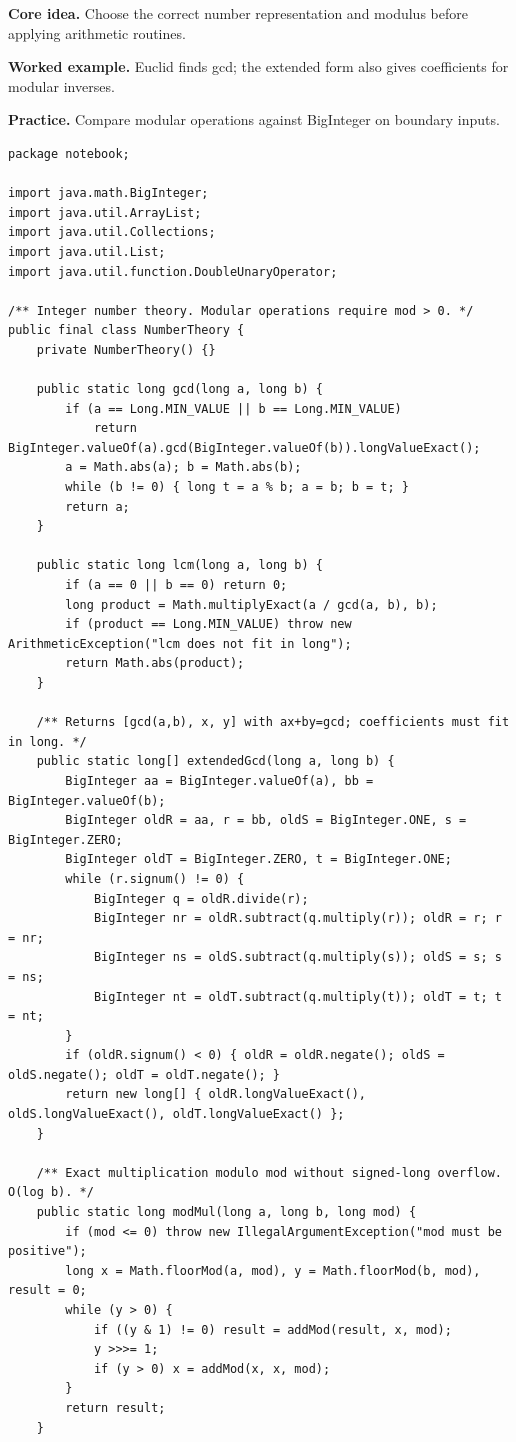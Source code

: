 \documentclass[10pt,letterpaper]{article}
\begin{document}
\noindent\textbf{Core idea.} Choose the correct number representation and modulus before applying arithmetic routines.\par
\noindent\textbf{Worked example.} Euclid finds gcd; the extended form also gives coefficients for modular inverses.\par
\noindent\textbf{Practice.} Compare modular operations against BigInteger on boundary inputs.\par
\begin{lstlisting}
package notebook;

import java.math.BigInteger;
import java.util.ArrayList;
import java.util.Collections;
import java.util.List;
import java.util.function.DoubleUnaryOperator;

/** Integer number theory. Modular operations require mod > 0. */
public final class NumberTheory {
    private NumberTheory() {}

    public static long gcd(long a, long b) {
        if (a == Long.MIN_VALUE || b == Long.MIN_VALUE)
            return BigInteger.valueOf(a).gcd(BigInteger.valueOf(b)).longValueExact();
        a = Math.abs(a); b = Math.abs(b);
        while (b != 0) { long t = a % b; a = b; b = t; }
        return a;
    }

    public static long lcm(long a, long b) {
        if (a == 0 || b == 0) return 0;
        long product = Math.multiplyExact(a / gcd(a, b), b);
        if (product == Long.MIN_VALUE) throw new ArithmeticException("lcm does not fit in long");
        return Math.abs(product);
    }

    /** Returns [gcd(a,b), x, y] with ax+by=gcd; coefficients must fit in long. */
    public static long[] extendedGcd(long a, long b) {
        BigInteger aa = BigInteger.valueOf(a), bb = BigInteger.valueOf(b);
        BigInteger oldR = aa, r = bb, oldS = BigInteger.ONE, s = BigInteger.ZERO;
        BigInteger oldT = BigInteger.ZERO, t = BigInteger.ONE;
        while (r.signum() != 0) {
            BigInteger q = oldR.divide(r);
            BigInteger nr = oldR.subtract(q.multiply(r)); oldR = r; r = nr;
            BigInteger ns = oldS.subtract(q.multiply(s)); oldS = s; s = ns;
            BigInteger nt = oldT.subtract(q.multiply(t)); oldT = t; t = nt;
        }
        if (oldR.signum() < 0) { oldR = oldR.negate(); oldS = oldS.negate(); oldT = oldT.negate(); }
        return new long[] { oldR.longValueExact(), oldS.longValueExact(), oldT.longValueExact() };
    }

    /** Exact multiplication modulo mod without signed-long overflow. O(log b). */
    public static long modMul(long a, long b, long mod) {
        if (mod <= 0) throw new IllegalArgumentException("mod must be positive");
        long x = Math.floorMod(a, mod), y = Math.floorMod(b, mod), result = 0;
        while (y > 0) {
            if ((y & 1) != 0) result = addMod(result, x, mod);
            y >>>= 1;
            if (y > 0) x = addMod(x, x, mod);
        }
        return result;
    }


\end{lstlisting}
\end{document}
